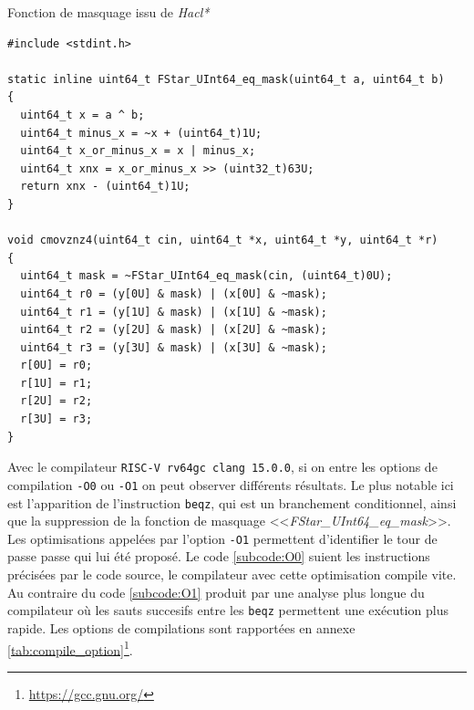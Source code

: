 \begin{listing}[!ht]
    \caption{Fonction de masquage issu de \textit{Hacl*}}
    \label{lst:Hacl_masking}
    \begin{verbatim}
#include <stdint.h>

static inline uint64_t FStar_UInt64_eq_mask(uint64_t a, uint64_t b)
{
  uint64_t x = a ^ b;
  uint64_t minus_x = ~x + (uint64_t)1U;
  uint64_t x_or_minus_x = x | minus_x;
  uint64_t xnx = x_or_minus_x >> (uint32_t)63U;
  return xnx - (uint64_t)1U;
}

void cmovznz4(uint64_t cin, uint64_t *x, uint64_t *y, uint64_t *r)
{
  uint64_t mask = ~FStar_UInt64_eq_mask(cin, (uint64_t)0U);
  uint64_t r0 = (y[0U] & mask) | (x[0U] & ~mask);
  uint64_t r1 = (y[1U] & mask) | (x[1U] & ~mask);
  uint64_t r2 = (y[2U] & mask) | (x[2U] & ~mask);
  uint64_t r3 = (y[3U] & mask) | (x[3U] & ~mask);
  r[0U] = r0;
  r[1U] = r1;
  r[2U] = r2;
  r[3U] = r3;
}
    \end{verbatim}
\end{listing}

Avec le compilateur \texttt{RISC-V rv64gc clang 15.0.0}, si on entre les options de compilation \texttt{-O0} ou \texttt{-O1} on peut observer différents résultats. Le plus notable ici est l'apparition de l'instruction \texttt{beqz}, qui est un branchement conditionnel, ainsi que la suppression de la fonction de masquage <<\textit{FStar\_UInt64\_eq\_mask}>>. Les optimisations appelées par l'option \texttt{-O1} permettent d'identifier le tour de passe passe qui lui été proposé. Le code \ref{subcode:O0} suient les instructions précisées par le code source, le compilateur avec cette optimisation compile vite. Au contraire du code \ref{subcode:O1} produit par une analyse plus longue du compilateur où les sauts succesifs entre les \texttt{beqz} permettent une exécution plus rapide. Les options de compilations sont rapportées en annexe \ref{tab:compile_option}\footnote{\url{https://gcc.gnu.org/}}.

